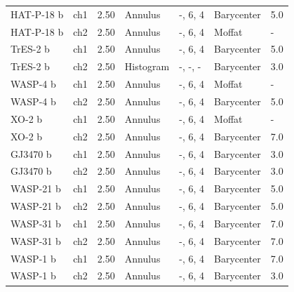 \begin{subappendices}
{\begin{landscape}
\begin{longtable}{lllllll}
  HAT-P-18 b  &     ch1 &           2.50 &           Annulus &         -, 6, 4  &         Barycenter &                 5.0 \\
  HAT-P-18 b  &     ch2 &           2.50 &           Annulus &         -, 6, 4  &             Moffat &                 - \\
  TrES-2 b   &     ch1 &           2.50 &           Annulus &         -, 6, 4  &         Barycenter &                 5.0 \\
  TrES-2 b   &     ch2 &           2.50 &         Histogram &   -, -, -  &         Barycenter &                 3.0 \\
  WASP-4 b   &     ch1 &           2.50 &           Annulus &         -, 6, 4  &             Moffat &                 - \\
  WASP-4 b   &     ch2 &           2.50 &           Annulus &         -, 6, 4  &         Barycenter &                 5.0 \\
  XO-2 b      &     ch1 &           2.50 &           Annulus &         -, 6, 4  &             Moffat &                 - \\
  XO-2 b      &     ch2 &           2.50 &           Annulus &         -, 6, 4  &          Barycenter &                 7.0 \\
  GJ3470 b   &     ch1 &           2.50 &           Annulus &         -, 6, 4  &         Barycenter &                 3.0 \\
  GJ3470 b  &     ch2 &           2.50 &           Annulus &         -, 6, 4  &         Barycenter &                 3.0 \\
  WASP-21 b  &     ch1 &           2.50 &           Annulus &         -, 6, 4  &         Barycenter &                 5.0 \\
  WASP-21 b  &     ch2 &           2.50 &           Annulus &         -, 6, 4  &         Barycenter &                 5.0 \\
  WASP-31 b  &     ch1 &           2.50 &           Annulus &         -, 6, 4  &         Barycenter &                 7.0 \\
  WASP-31 b  &     ch2 &           2.50 &           Annulus &         -, 6, 4  &         Barycenter &                 7.0 \\
  WASP-1 b   &     ch1 &           2.50 &           Annulus &         -, 6, 4  &         Barycenter &                 7.0 \\
  WASP-1 b   &     ch2 &           2.50 &           Annulus &         -, 6, 4  &         Barycenter &                 3.0 \\

\end{longtable}
\end{landscape}}
\end{subappendices}

